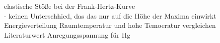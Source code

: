 elastische Stöße  bei der Frank-Hertz-Kurve \\
- keinen Unterschhied, das das nur auf die Höhe der Maxima einwirkt \\
Energieverteilung Raumtemperatur und hohe Temoeratur vergleichen \\
Literaturwert Anregungsspannung für Hg
 